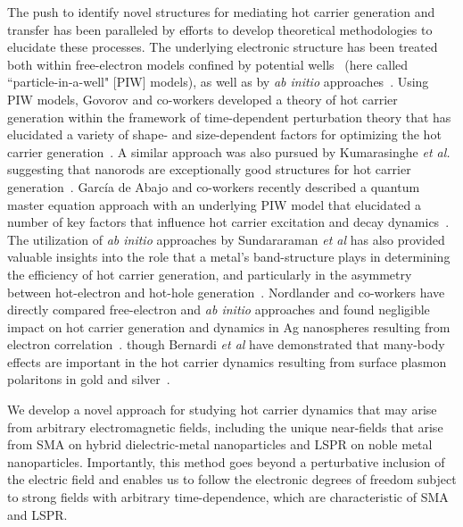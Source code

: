 \documentclass[journal=jpclcd,manuscript=article]{achemso}
\begin{document}
The push to identify novel structures for mediating hot carrier generation and transfer has been paralleled by 
efforts to develop theoretical methodologies to elucidate these processes.  The underlying electronic
structure has been treated both within free-electron models confined by potential wells~\cite{GZG_JPCC_2013,ZG_JPCC_2014,MLK_ACSNano_2014,KPB_SciRep_2015,SAG_ACSPhotonics_2016} (here called
``particle-in-a-well" [PIW] models), as well as by {\it ab initio} approaches~\cite{SNJ_NatComm_2014,BMN_NatComm_2015,MWW_NatComm_2015,BSN_ACSNano_2016}.
Using PIW models, Govorov and co-workers developed a theory of 
hot carrier generation within the framework of time-dependent perturbation theory that
has elucidated a variety of shape- and size-dependent factors for optimizing 
the hot carrier generation~\cite{GZG_JPCC_2013,ZG_JPCC_2014}.  A similar approach was also pursued by Kumarasinghe {\it et al.} suggesting
that nanorods are exceptionally good structures for hot carrier generation~\cite{KPB_SciRep_2015}.  Garc\'ia de Abajo and co-workers recently described a 
quantum master equation approach with an underlying PIW model that elucidated a number of key factors that influence
hot carrier excitation and decay dynamics~\cite{SAG_ACSPhotonics_2016}.  The utilization of {\it ab initio} approaches by Sundararaman {\it et al} 
has also provided valuable insights into the role that a metal's band-structure plays
in determining the efficiency of hot carrier generation, and particularly in the asymmetry between hot-electron
and hot-hole generation~\cite{SNJ_NatComm_2014}.  Nordlander and co-workers have directly compared free-electron and {\it ab initio} approaches
and found negligible impact on hot carrier generation and dynamics in Ag nanospheres resulting from electron correlation~\cite{MLK_ACSNano_2014}.   
though Bernardi {\it et al} have demonstrated that many-body effects are important in the hot carrier dynamics resulting
from surface plasmon polaritons in gold and silver~\cite{BMN_NatComm_2015}.

We develop a novel approach for studying hot carrier dynamics that may arise from arbitrary electromagnetic
fields, including the unique near-fields that arise from SMA on hybrid dielectric-metal nanoparticles and LSPR
on noble metal nanoparticles.  Importantly, this method goes beyond a perturbative inclusion of the electric field and enables us to follow the electronic degrees of freedom subject to strong fields with arbitrary time-dependence, which are characteristic of SMA and LSPR.   
\end{document}
